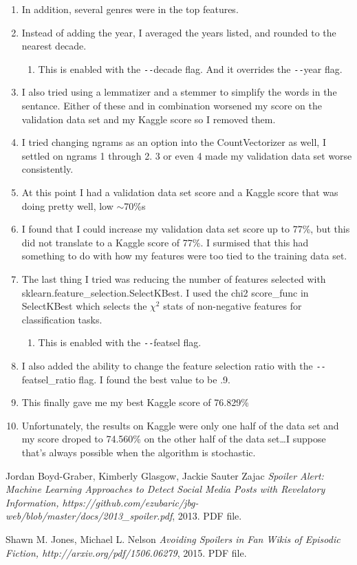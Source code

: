 \documentclass[8pt]{extarticle}
\begin{document}
\begin{enumerate}
  \item In addition, several genres were in the top features.
  \item Instead of adding the year, I averaged the years listed, and rounded to the nearest decade.
  \begin{enumerate}
    \item This is enabled with the \texttt{-{}-}decade flag.  And it overrides the \texttt{-{}-}year flag.
  \end{enumerate}
  \item I also tried using a lemmatizer and a stemmer to simplify the words in the sentance.  Either of these and in combination worsened my score on the validation data set and my Kaggle score so I removed them.
  \item I tried changing ngrams as an option into the CountVectorizer as well, I settled on ngrams 1 through 2.  3 or even 4 made my validation data set worse consistently.
  \item At this point I had a validation data set score and a Kaggle score that was doing pretty well, low $\sim$70\%s
  \item I found that I could increase my validation data set score up to 77\%, but this did not translate to a Kaggle score of 77\%.  I surmised that this had something to do with how my features were too tied to the training data set.
  \item The last thing I tried was reducing the number of features selected with sklearn.feature\_selection.SelectKBest.  I used the chi2 score\_func in SelectKBest which selects the ${\chi}^2$ stats of non-negative features for classification tasks.
  \begin{enumerate}
    \item This is enabled with the \texttt{-{}-}featsel flag.
  \end{enumerate}
  \item I also added the ability to change the feature selection ratio with the \texttt{-{}-}featsel\_ratio flag.  I found the best value to be .9.
  \item This finally gave me my best Kaggle score of 76.829\%
  \item Unfortunately, the results on Kaggle were only one half of the data set and my score droped to 74.560\% on the other half of the data set\ldots I suppose that's always possible when the algorithm is stochastic.
\end{enumerate}

\newpage
\begin{thebibliography}{1}
   Jordan Boyd-Graber, Kimberly Glasgow, Jackie Sauter Zajac {\em Spoiler Alert: Machine Learning Approaches to Detect
Social Media Posts with Revelatory Information, https://github.com/ezubaric/jbg-web/blob/master/docs/2013\_spoiler.pdf}, 2013. PDF file.

   Shawn M. Jones, Michael L. Nelson {\em Avoiding Spoilers in Fan Wikis of Episodic Fiction, http://arxiv.org/pdf/1506.06279}, 2015. PDF file.

\end{thebibliography}
\end{document}
